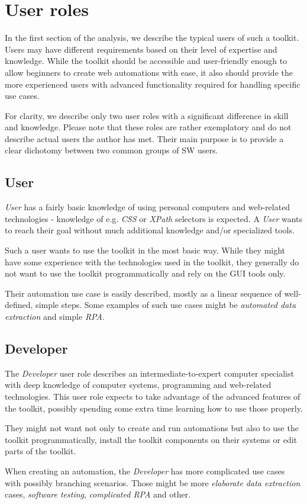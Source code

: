 \section{User roles} \label{userroles}

In the first section of the analysis, we describe the typical users of such a toolkit.
Users may have different requirements based on their level of expertise and knowledge.
While the toolkit should be accessible and user-friendly enough to allow beginners to
create web automations with ease, it also should provide the more experienced users with 
advanced functionality required for handling specific use cases. 

For clarity, we describe only two user roles with a significant difference in skill and knowledge.
Please note that these roles are rather exemplatory and do not describe actual users the author has met.
Their main purpose is to provide a clear dichotomy between two common groups of \acl{SW} users.

\subsection{User} \label{UserUserRole}
\textit{User} has a fairly basic knowledge of using personal computers 
and web-related technologies - knowledge of e.g. \textit{CSS} or \textit{XPath} selectors is expected.
A \textit{User} wants to reach their goal without much additional knowledge and/or specialized tools.

Such a user wants to use the toolkit in the most basic way.
While they might have some experience with the technologies used in the toolkit, they generally do not want to use the toolkit programmatically and rely on the \ac{GUI} tools only.

Their automation use case is easily described, mostly as a linear sequence of well-defined, simple steps.
Some examples of such use cases might be \textit{automated data extraction} and simple \textit{\acl{RPA}}.


\subsection{Developer} \label{DevUserRole}
The \textit{Developer} user role describes an intermediate-to-expert computer specialist with deep
knowledge of computer systems, programming and web-related technologies.
This user role expects to take advantage of the advanced features of the toolkit, possibly spending some extra time learning how to use those properly.

They might not want not only to create and run automations but also to use the toolkit programmatically, 
install the toolkit components on their systems or edit parts of the toolkit. 

When creating an automation, the \textit{Developer} has more complicated use cases with possibly branching scenarios. 
Those might be more \textit{elaborate data extraction} cases, \textit{software testing}, \textit{complicated \ac{RPA}} and other.